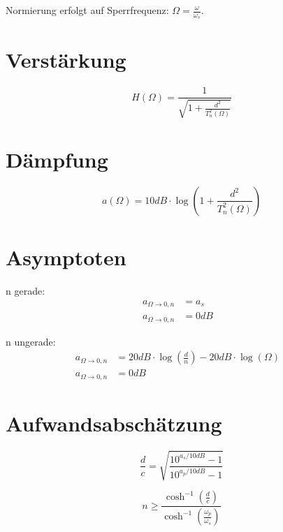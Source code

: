 \documentclass[a4paper, 12pt]{report}
\begin{document}
	Normierung erfolgt auf Sperrfrequenz: $ \Omega = \frac{\omega}{\omega_s} $.
	\vspace{0.5cm}

\begin{minipage}[t]{0.4\textwidth}
	\section*{Verstärkung}
	    \[ H(\Omega) = \frac{1}{\sqrt{1 + \frac{d^2}{T^2_n\left(\Omega\right)}}} \]
\end{minipage}
\begin{minipage}[t]{0.6\textwidth}
\section*{Dämpfung}
	    \[ a(\Omega) = 10dB \cdot \log{\left(1 + \frac{d^2}{T^2_n\left(\Omega\right)}\right)} \]
\end{minipage}

\section*{Asymptoten}
   	\begin{minipage}[t]{0.5\textwidth}
		n gerade:
		\begin{align*}
			a_{\Omega\rightarrow 0,n} &= a_s &\\
			a_{\Omega\rightarrow 0,n} &= 0dB &
		\end{align*}
   	\end{minipage}
   	\begin{minipage}[t]{0.5\textwidth}
		n ungerade:
		\vspace{-0.2cm}
		\begin{align*}
			a_{\Omega\rightarrow 0,n} &= 20dB \cdot \log \left(\frac{d}{n}\right) - 20dB \cdot \log \left(\Omega\right) &\\
			a_{\Omega\rightarrow 0,n} &= 0dB &
		\end{align*}
   	\end{minipage}
	
\section*{Aufwandsabschätzung}
	\vspace{-0.5cm}
   	\begin{minipage}[t]{0.5\textwidth}
		\[ \frac{d}{c} = \sqrt{\frac{10^{a_s/10dB} - 1}{10^{a_p/10dB} - 1}} \]
   	\end{minipage}
   	\begin{minipage}[t]{0.5\textwidth}
		\[ n \ge \frac{\cosh^{-1}{\left(\frac{d}{c}\right)}}{\cosh^{-1}{\left(\frac{\omega_p}{\omega_s}\right)}} \]
   	\end{minipage}
   	\vspace{0cm}
   	
\end{document}
